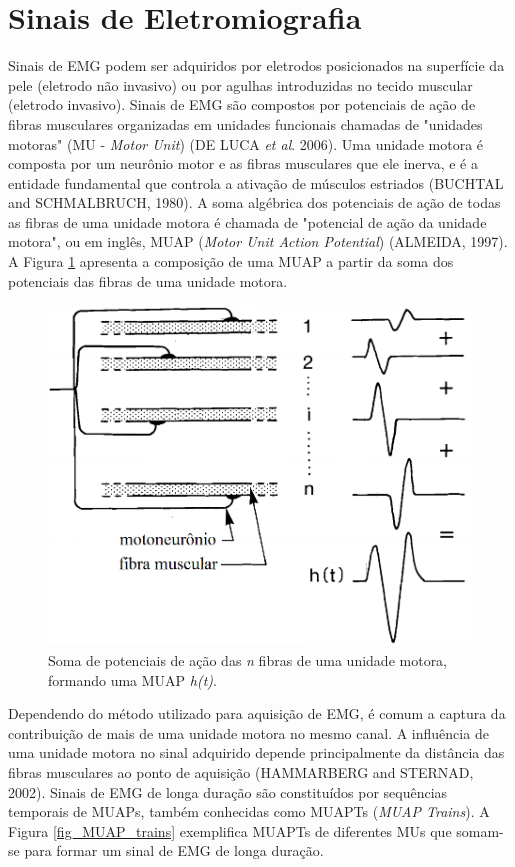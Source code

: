 \section{Sinais de Eletromiografia}

Sinais de EMG podem ser adquiridos por eletrodos posicionados na superfície da pele (eletrodo não invasivo) ou por agulhas introduzidas no tecido muscular (eletrodo invasivo). Sinais de EMG são compostos por potenciais de ação de fibras musculares organizadas em unidades funcionais chamadas de "unidades motoras" (MU - \emph{Motor Unit}) (DE LUCA \emph{et al}. 2006). Uma unidade motora é composta por um neurônio motor e as fibras musculares que ele inerva, e é a entidade fundamental que controla a ativação de músculos estriados (BUCHTAL and SCHMALBRUCH, 1980). A soma algébrica dos potenciais de ação de todas as fibras de uma unidade motora é chamada de "potencial de ação da unidade motora", ou em inglês, MUAP (\emph{Motor Unit Action Potential}) (ALMEIDA, 1997). A Figura \ref{fig_MUAP_comp} apresenta a composição de uma MUAP a partir da soma dos potenciais das fibras de uma unidade motora.

\begin{figure}[htb]
	\caption{\label{fig_MUAP_comp}Soma de potenciais de ação das \emph{n} fibras de uma unidade motora, formando uma MUAP \emph{h(t)}.}
	\begin{center}
	    \includegraphics[width=0.75\linewidth]{./img/MUAP_oneMU.png}
	\end{center}
\end{figure}

Dependendo do método utilizado para aquisição de EMG, é comum a captura da contribuição de mais de uma unidade motora no mesmo canal. A influência de uma unidade motora no sinal adquirido depende principalmente da distância das fibras musculares ao ponto de aquisição (HAMMARBERG and STERNAD, 2002). Sinais de EMG de longa duração são constituídos por sequências temporais de MUAPs, também conhecidas como MUAPTs (\emph{MUAP Trains}). A Figura \ref{fig_MUAP_trains} exemplifica MUAPTs de diferentes MUs que somam-se para formar um sinal de EMG de longa duração.


